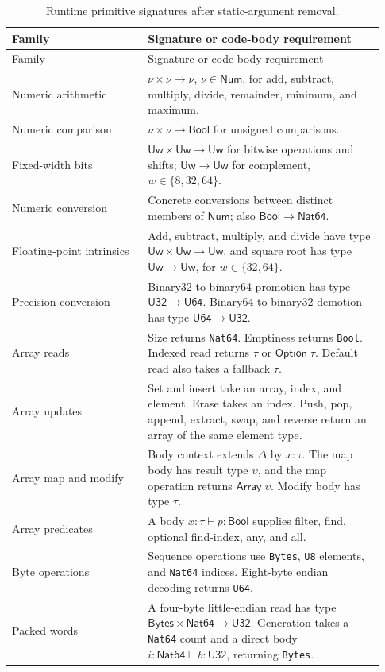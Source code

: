 \documentclass[11pt]{article}
\newcommand{\code}[1]{\texttt{#1}}
\newcommand{\ty}[1]{\mathsf{#1}}
\begin{document}
\begin{longtable}{L{0.34\linewidth}L{0.59\linewidth}}
\caption{Runtime primitive signatures after static-argument removal.}\label{tab:primitives}\\
\toprule Family & Signature or code-body requirement\\\midrule\endfirsthead
\toprule Family & Signature or code-body requirement\\\midrule\endhead
Numeric arithmetic & $\nu\times\nu\to\nu$, $\nu\in\ty{Num}$, for add, subtract, multiply, divide, remainder, minimum, and maximum.\\
Numeric comparison & $\nu\times\nu\to\ty{Bool}$ for unsigned comparisons.\\
Fixed-width bits & $\ty{Uw}\times\ty{Uw}\to\ty{Uw}$ for bitwise operations and shifts; $\ty{Uw}\to\ty{Uw}$ for complement, $w\in\{8,32,64\}$.\\
Numeric conversion & Concrete conversions between distinct members of $\ty{Num}$; also $\ty{Bool}\to\ty{Nat64}$.\\
Floating-point intrinsics & Add, subtract, multiply, and divide have type $\ty{Uw}\times\ty{Uw}\to\ty{Uw}$, and square root has type $\ty{Uw}\to\ty{Uw}$, for $w\in\{32,64\}$.\\
Precision conversion & Binary32-to-binary64 promotion has type $\ty{U32}\to\ty{U64}$.  Binary64-to-binary32 demotion has type $\ty{U64}\to\ty{U32}$.\\
Array reads & Size returns \code{Nat64}.  Emptiness returns \code{Bool}.  Indexed read returns $\tau$ or $\ty{Option}\;\tau$.  Default read also takes a fallback $\tau$.\\
Array updates & Set and insert take an array, index, and element.  Erase takes an index.  Push, pop, append, extract, swap, and reverse return an array of the same element type.\\
Array map and modify & Body context extends $\Delta$ by $x:\tau$.  The map body has result type $\upsilon$, and the map operation returns $\ty{Array}\;\upsilon$.  Modify body has type $\tau$.\\
Array predicates & A body $x:\tau\vdash p:\ty{Bool}$ supplies filter, find, optional find-index, any, and all.\\
Byte operations & Sequence operations use \code{Bytes}, \code{U8} elements, and \code{Nat64} indices.  Eight-byte endian decoding returns \code{U64}.\\
Packed words & A four-byte little-endian read has type $\ty{Bytes}\times\ty{Nat64}\to\ty{U32}$.  Generation takes a \code{Nat64} count and a direct body $i:\ty{Nat64}\vdash b:\ty{U32}$, returning \code{Bytes}.\\

\end{longtable}
\end{document}
